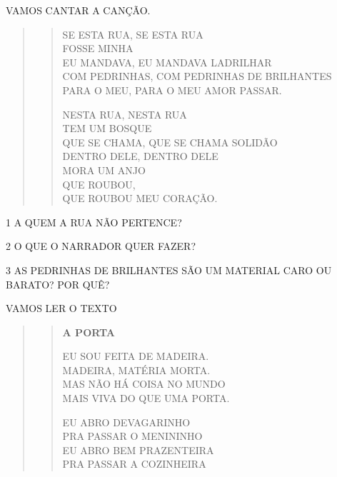 VAMOS CANTAR A CANÇÃO.

\begin{quote}
\begin{verse}
SE ESTA RUA, SE ESTA RUA\\
FOSSE MINHA\\
EU MANDAVA, EU MANDAVA LADRILHAR\\
COM PEDRINHAS, COM PEDRINHAS DE BRILHANTES\\
PARA O MEU, PARA O MEU AMOR PASSAR.

NESTA RUA, NESTA RUA\\
TEM UM BOSQUE\\
QUE SE CHAMA, QUE SE CHAMA SOLIDÃO\\
DENTRO DELE, DENTRO DELE\\
MORA UM ANJO\\
QUE ROUBOU,\\
QUE ROUBOU MEU CORAÇÃO.
\end{verse}

\end{quote}

\num{1} A QUEM A RUA NÃO PERTENCE?


\num{2} O QUE O NARRADOR QUER FAZER?


\num{3} AS PEDRINHAS DE BRILHANTES SÃO UM MATERIAL CARO OU BARATO? POR QUÊ?


\pagebreak
VAMOS LER O TEXTO

\begin{quote}
\begin{verse}
\textbf{A PORTA}

EU SOU FEITA DE MADEIRA.\\
MADEIRA, MATÉRIA MORTA.\\
MAS NÃO HÁ COISA NO MUNDO\\
MAIS VIVA DO QUE UMA PORTA.

EU ABRO DEVAGARINHO\\
PRA PASSAR O MENININHO\\
EU ABRO BEM PRAZENTEIRA\\
PRA PASSAR A COZINHEIRA
\end{verse}

\end{quote}

